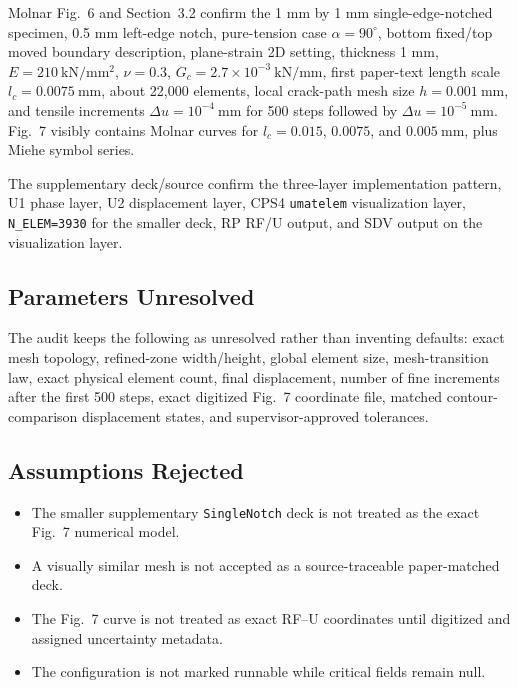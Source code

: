 \documentclass[11pt,a4paper]{article}
\begin{document}
Molnar Fig.~6 and Section~3.2 confirm the 1 mm by 1 mm single-edge-notched specimen, 0.5 mm left-edge notch, pure-tension case \(\alpha=90^\circ\), bottom fixed/top moved boundary description, plane-strain 2D setting, thickness 1 mm, \(E=210\ \mathrm{kN/mm^2}\), \(\nu=0.3\), \(G_c=2.7\times10^{-3}\ \mathrm{kN/mm}\), first paper-text length scale \(l_c=0.0075\ \mathrm{mm}\), about 22,000 elements, local crack-path mesh size \(h=0.001\ \mathrm{mm}\), and tensile increments \(\Delta u=10^{-4}\ \mathrm{mm}\) for 500 steps followed by \(\Delta u=10^{-5}\ \mathrm{mm}\). Fig.~7 visibly contains Molnar curves for \(l_c=0.015\), \(0.0075\), and \(0.005\ \mathrm{mm}\), plus Miehe symbol series.

The supplementary deck/source confirm the three-layer implementation pattern, U1 phase layer, U2 displacement layer, CPS4 \texttt{umatelem} visualization layer, \texttt{N\_ELEM=3930} for the smaller deck, RP RF/U output, and SDV output on the visualization layer.

\subsection*{Parameters Unresolved}

The audit keeps the following as unresolved rather than inventing defaults: exact mesh topology, refined-zone width/height, global element size, mesh-transition law, exact physical element count, final displacement, number of fine increments after the first 500 steps, exact digitized Fig.~7 coordinate file, matched contour-comparison displacement states, and supervisor-approved tolerances.

\subsection*{Assumptions Rejected}

\begin{itemize}
  \item The smaller supplementary \texttt{SingleNotch} deck is not treated as the exact Fig.~7 numerical model.
  \item A visually similar mesh is not accepted as a source-traceable paper-matched deck.
  \item The Fig.~7 curve is not treated as exact RF--U coordinates until digitized and assigned uncertainty metadata.
  \item The configuration is not marked runnable while critical fields remain null.
\end{itemize}
\end{document}
